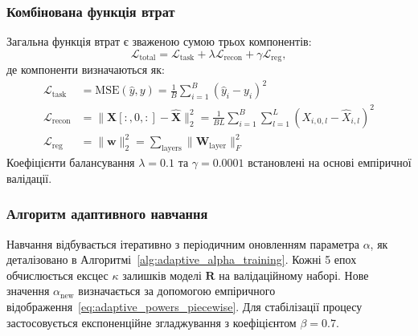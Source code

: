 \documentclass[12pt,a4paper]{article}
\begin{document}
\subsubsection{Комбінована функція втрат}
Загальна функція втрат є зваженою сумою трьох компонентів:
\begin{equation}
	\mathcal{L}_{\text{total}} = \mathcal{L}_{\text{task}} + \lambda \mathcal{L}_{\text{recon}} + \gamma \mathcal{L}_{\text{reg}},
\end{equation}
де компоненти визначаються як:
\begin{align}
	\mathcal{L}_{\text{task}} &= \text{MSE}(\hat{y}, y) = \frac{1}{B} \sum_{i=1}^B (\hat{y}_i - y_i)^2 \\
	\mathcal{L}_{\text{recon}} &= \|\mathbf{X}[:, 0, :] - \hat{\mathbf{X}}\|_2^2 = \frac{1}{BL} \sum_{i=1}^B \sum_{l=1}^L (X_{i,0,l} - \hat{X}_{i,l})^2 \\
	\mathcal{L}_{\text{reg}} &= \|\mathbf{w}\|_2^2 = \sum_{\text{layers}} \|\mathbf{W}_{\text{layer}}\|_F^2
\end{align}
Коефіцієнти балансування $\lambda = 0.1$ та $\gamma = 0.0001$ встановлені на основі емпіричної валідації.

\subsubsection{Алгоритм адаптивного навчання}
Навчання відбувається ітеративно з періодичним оновленням параметра $\alpha$, як деталізовано в Алгоритмі~\ref{alg:adaptive_alpha_training}. Кожні 5 епох обчислюється ексцес $\kappa$ залишків моделі $\mathbf{R}$ на валідаційному наборі. Нове значення $\alpha_{\text{new}}$ визначається за допомогою емпіричного відображення~\eqref{eq:adaptive_powers_piecewise}. Для стабілізації процесу застосовується експоненційне згладжування з коефіцієнтом $\beta = 0.7$.
\end{document}
